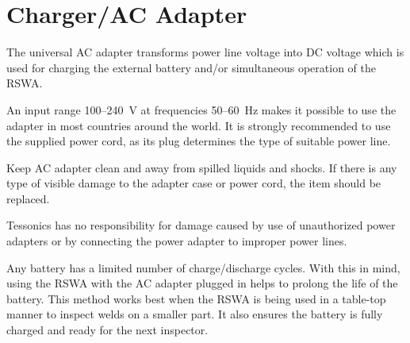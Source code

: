 \chapter[chargerac-adapter]{Charger/AC Adapter}

The universal AC adapter transforms power line voltage into DC voltage which is used for charging the external battery and/or simultaneous operation of the RSWA.

An input range 100–240 V at frequencies 50–60 Hz makes it possible to use the adapter in most countries around the world. It is strongly recommended to use the supplied power cord, as its plug determines the type of suitable power line.

Keep AC adapter clean and away from spilled liquids and shocks. If there is any type of visible damage to the adapter case or power cord, the item should be replaced.
\stopNOTE

Tessonics has no responsibility for damage caused by use of unauthorized power adapters or by connecting the power adapter to improper power lines.
\stopWARNING

Any battery has a limited number of charge/discharge cycles. With this in mind, using the RSWA with the AC adapter plugged in helps to prolong the life of the battery. This method works best when the RSWA is being used in a table-top manner to inspect welds on a smaller part. It also ensures the battery is fully charged and ready for the next inspector.